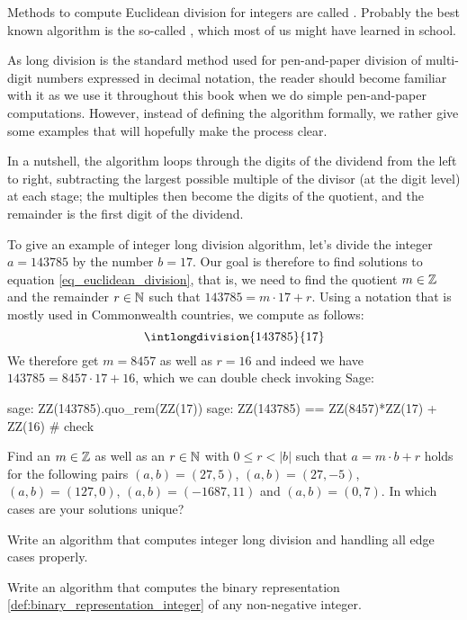 Methods to compute Euclidean division for integers are called . Probably the best known algorithm is the so-called , which most of us might have learned in school.

As long division is the standard method used for pen-and-paper division of multi-digit numbers expressed in decimal notation, the reader should become familiar with it as we use it throughout this book when we do simple pen-and-paper computations. However, instead of defining the algorithm formally, we rather give some examples that will hopefully  make the process clear.

In a nutshell, the algorithm loops through the digits of the dividend from the left to right, subtracting the largest possible multiple of the divisor (at the digit level) at each stage; the multiples then become the digits of the quotient, and the remainder is the first digit of the dividend.

\begin{example} To give an example of integer long division algorithm, let's divide the integer $a=143785$ by the number $b=17$. Our goal is therefore to find solutions to equation \ref{eq_euclidean_division}, that is, we need to find the quotient $m\in\mathbb{Z}$ and the remainder $r \in \mathbb{N}$ such that $143785 = m\cdot 17 + r$. Using a notation that is mostly used in Commonwealth countries, we compute as follows:
\begin{equation}
\intlongdivision{143785}{17}
\end{equation}
We therefore get $m=8457$ as well as $r=16$ and indeed we have $143785 = 8457\cdot 17 + 16$, which we can double check invoking Sage:
\begin{sagecommandline}
sage: ZZ(143785).quo_rem(ZZ(17))
sage: ZZ(143785) == ZZ(8457)*ZZ(17) + ZZ(16) # check
\end{sagecommandline}

\end{example}
\begin{exercise}
Find an $m\in\mathbb{Z}$ as well as an $r\in\mathbb{N}$ with $0\leq r< |b|$ such that $a= m\cdot b +r$ holds for the following pairs $(a,b) = (27,5)$, $(a,b)=(27,-5)$, $(a,b)=(127,0)$, $(a,b)= (-1687, 11)$ and $(a,b)= (0, 7)$. In which cases are your solutions unique?
\end{exercise}
\begin{exercise}
Write an algorithm that computes integer long division and handling all edge cases properly.
\end{exercise}
\begin{exercise}
Write an algorithm that computes the binary representation \ref{def:binary_representation_integer} of any non-negative integer.
\end{exercise}

